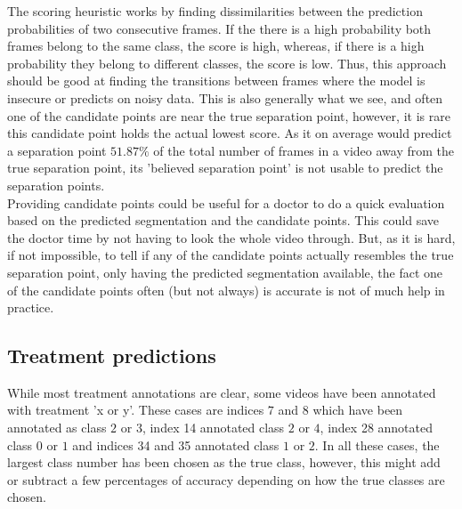 The scoring heuristic works by finding dissimilarities between the prediction probabilities of two consecutive frames. If the there is a high probability both frames belong to the same class, the score is high, whereas, if there is a high probability they belong to different classes, the score is low. Thus, this approach should be good at finding the transitions between frames where the model is insecure or predicts on noisy data. This is also generally what we see, and often one of the candidate points are near the true separation point, however, it is rare this candidate point holds the actual lowest score. As it on average would predict a separation point $51.87\%$ of the total number of frames in a video away from the true separation point, its 'believed separation point' is not usable to predict the separation points.\\
Providing candidate points could be useful for a doctor to do a quick evaluation based on the predicted segmentation and the candidate points. This could save the doctor time by not having to look the whole video through. But, as it is hard, if not impossible, to tell if any of the candidate points actually resembles the true separation point, only having the predicted segmentation available, the fact one of the candidate points often (but not always) is accurate is not of much help in practice.

\subsection{Treatment predictions}
While most treatment annotations are clear, some videos have been annotated with treatment 'x or y'. These cases are indices $7$ and $8$ which have been annotated as class $2$ or $3$, index 14 annotated class $2$ or $4$, index 28 annotated class $0$ or $1$ and indices 34 and 35 annotated class $1$ or $2$. In all these cases, the largest class number has been chosen as the true class, however, this might add or subtract a few percentages of accuracy depending on how the true classes are chosen.

